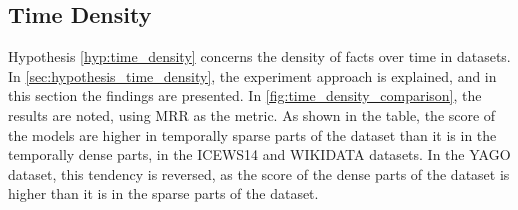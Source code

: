 \subsection{Time Density}
\label{sec:time_density_experiment}

Hypothesis \ref{hyp:time_density} concerns the density of facts over time in datasets. In \autoref{sec:hypothesis_time_density}, the experiment approach is explained, and in this section the findings are presented. In \autoref{fig:time_density_comparison}, the results are noted, using MRR as the metric. As shown in the table, the score of the models are higher in temporally sparse parts of the dataset than it is in the temporally dense parts, in the ICEWS14 and WIKIDATA datasets. In the YAGO dataset, this tendency is reversed, as the score of the dense parts of the dataset is higher than it is in the sparse parts of the dataset.


